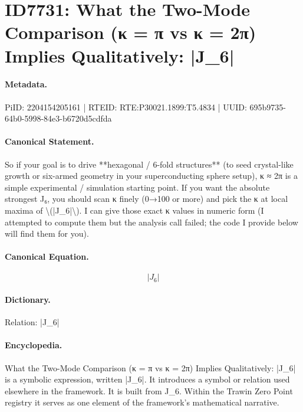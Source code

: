 \section*{ID7731: What the Two-Mode Comparison (κ = π vs κ = 2π) Implies Qualitatively: |J\_6|}
\paragraph{Metadata.}
PiID: 2204154205161 | RTEID: RTE:P30021.1899:T5.4834 | UUID: 695b9735-64b0-5998-84e3-b6720d5cdfda

\paragraph{Canonical Statement.}
So if your goal is to drive **hexagonal / 6-fold structures** (to seed crystal-like growth or six-armed geometry in your superconducting sphere setup), κ ≈ 2π is a simple experimental / simulation starting point. If you want the absolute strongest J₆, you should scan κ finely (0→100 or more) and pick the κ at local maxima of \textbackslash{}(|J\_6|\textbackslash{}). I can give those exact κ values in numeric form (I attempted to compute them but the analysis call failed; the code I provide below will find them for you).

\paragraph{Canonical Equation.}
\[
|J_6|
\]

\paragraph{Dictionary.}
Relation: |J\_6|

\paragraph{Encyclopedia.}
What the Two-Mode Comparison (κ = π vs κ = 2π) Implies Qualitatively: |J\_6| is a symbolic expression, written |J\_6|. It introduces a symbol or relation used elsewhere in the framework. It is built from J\_6. Within the Trawin Zero Point registry it serves as one element of the framework's mathematical narrative.
